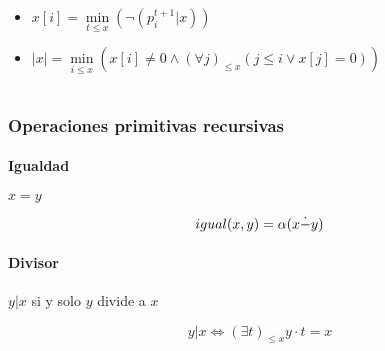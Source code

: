 \begin{demo}
	\begin{itemize}
		\item $x[i] = \min\limits_{t\leq x}\left(\lnot\left(p_i^{t+1}|x\right)\right)$
		\item $|x| = \min\limits_{i\leq x}\left(x[i]\neq 0 \land \left(\forall j\right)_{\leq x} \left(j\leq i \lor x[j] = 0\right)\right)$
	\end{itemize}
\end{demo}
	\section{}
	
	\section{}
	
	\part{}
	
	\section{}
	
	\section{}
	
	\section{}
	
	\section{}
	
\appendix
\section{Operaciones primitivas recursivas} \label{appendix::primitivas}
\subsection{Igualdad}\label{appendix::primitivas::igualdad}
$x = y$
\begin{demo}
	$$igual(x,y) = \alpha(x \dot{-} y)$$
\end{demo}

\subsection{Divisor}
$y|x$ si y solo $y$ divide a $x$
\begin{demo}
	$$y|x \iff (\exists t)_{\leq x} y\cdot t = x $$
\end{demo}





